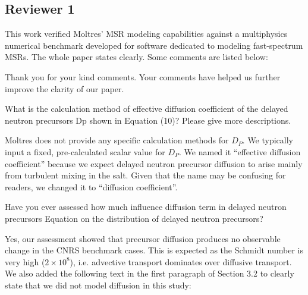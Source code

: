 \documentclass[answers,11pt]{exam}
\begin{document}
\begin{questions}
\section*{Reviewer 1}

        \question This work verified Moltres' MSR modeling capabilities against
        a multiphysics numerical benchmark developed for software dedicated to
        modeling fast-spectrum MSRs. The whole paper states clearly. Some
        comments are listed below:
        
        \begin{solution}
            Thank you for your kind comments. Your comments have helped us
            further improve the clarity of our paper.
        \end{solution}

        \question What is the calculation method of effective diffusion
        coefficient of the delayed neutron precursors Dp shown in Equation
        (10)? Please give more descriptions.

        \begin{solution}
        	Moltres does not provide any specific calculation methods for
        	$D_P$. We typically input a fixed, pre-calculated scalar value
        	for $D_P$. We named it ``effective diffusion coefficient'' because
        	we expect delayed neutron precursor diffusion to arise mainly from
        	turbulent mixing in the salt. Given that the name may be confusing
        	for readers, we changed it to ``diffusion coefficient''.
        \end{solution}

        \question Have you ever assessed how much influence diffusion term in
        delayed neutron precursors Equation on the distribution of delayed
        neutron precursors?
        \begin{solution}
        	Yes, our assessment showed that precursor diffusion produces no
        	observable change in the CNRS benchmark cases. This is expected as
        	the Schmidt number is very high ($2\times10^8$), i.e. advective
        	transport dominates over diffusive transport. We also added the
        	following text in the first paragraph of Section 3.2 to clearly
        	state that we did not model diffusion in this study:
        	

\end{solution}
\end{questions}
\end{document}
